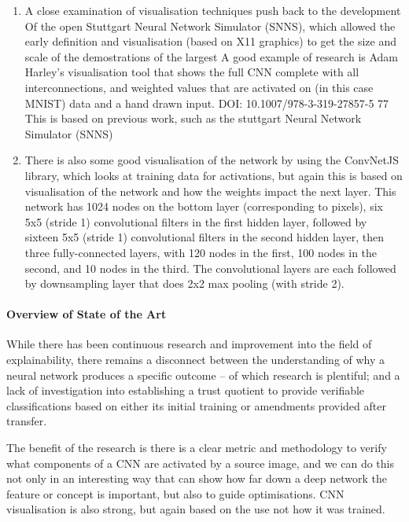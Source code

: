 \begin{enumerate}
    \item A close examination of visualisation techniques push back to the development Of the open Stuttgart Neural Network Simulator (SNNS), which allowed the early definition and visualisation (based on X11 graphics) to get the size and scale of the demostrations of the largest A good example of research is Adam Harley's visualisation tool \cite{li_visualizing_2018} that shows the full CNN complete with all interconnections, and weighted values that are activated on (in this case MNIST) data and a hand drawn input. DOI: 10.1007/978-3-319-27857-5 77  This is based on previous work, such as the stuttgart Neural Network Simulator (SNNS) 
    \item There is also some good visualisation of the network by using the ConvNetJS library, which looks at training data for activations, but again this is based on visualisation of the network and how the weights impact the next layer. This network has 1024 nodes on the bottom layer (corresponding to pixels), six 5x5 (stride 1) convolutional filters in the first hidden layer, followed by sixteen 5x5 (stride 1) convolutional filters in the second hidden layer, then three fully-connected layers, with 120 nodes in the first, 100 nodes in the second, and 10 nodes in the third. The convolutional layers are each followed by downsampling layer that does 2x2 max pooling (with stride 2). 
\end{enumerate}


\paragraph{Overview of State of the Art}
While there has been continuous research and improvement into the field of explainability, there remains a disconnect between the understanding of why a neural network produces a specific outcome – of which research is plentiful; and a lack of investigation into establishing a trust quotient to provide verifiable classifications based on either its initial training or amendments provided after transfer.

The benefit of the research is there is a clear metric and methodology to verify what components of a CNN are activated by a source image, and we can do this not only in an interesting way that can show how far down a deep network the feature or concept is important, but also to guide optimisations. CNN visualisation is also strong, but again based on the use not how it was trained.

